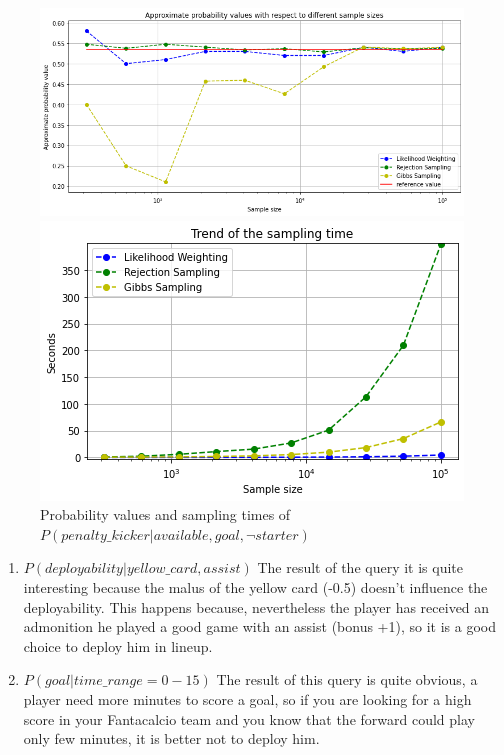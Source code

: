 \documentclass[a4paper,10pt]{report}
\begin{document}
    \begin{figure}[h]
      \centering\begin{minipage}[b]{0.45\textwidth}
        \includegraphics[width=\textwidth]{assets/img/query2prob.png}
      \end{minipage}
      \hfill\begin{minipage}[b]{0.45\textwidth}
        \includegraphics[width=\textwidth]{assets/img/query2time.png}
      \end{minipage}
    \caption{Probability values and sampling times of $P(penalty\_kicker | available, goal,\neg starter)$}
    \label{fig:query2results}
    \end{figure}

\begin{enumerate}
\addtocounter{enumi}{2}
    \item$P(deployability | yellow\_card, assist)$
    \newline
  The result of the query it is quite interesting because the malus of the yellow card (-0.5) doesn't influence the deployability. This happens because, nevertheless the player has received an admonition he played a good game with an assist (bonus +1), so it is a good choice to deploy him in lineup.
          

    \item $P(goal | time\_range = 0-15)$
    \newline
    The result of this query is quite obvious, a player need more minutes to score a goal, so if you are looking for a high score in your Fantacalcio team and you know that the forward could play only few minutes, it is better not to deploy him.
\end{enumerate}
\end{document}
